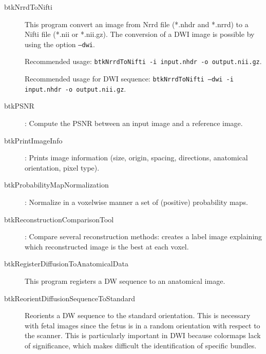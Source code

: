 \begin{description}
\item[btkNrrdToNifti] This program convert an image from Nrrd file (*.nhdr and *.nrrd) to a Nifti file (*.nii or *.nii.gz). The conversion of a DWI image is possible by using the option \texttt{--dwi}.

Recommended usage: \texttt{btkNrrdToNifti -i input.nhdr -o output.nii.gz}. 

Recommended usage  for DWI sequence: \texttt{btkNrrdToNifti --dwi -i input.nhdr -o output.nii.gz}.
\item[btkPSNR]: Compute the PSNR between an input image and a reference image.
\item[btkPrintImageInfo]: Prints image information (size, origin, spacing, directions, anatomical orientation, pixel type).
\item[btkProbabilityMapNormalization]: Normalize in a voxelwise manner a set of (positive) probability maps. 
\item[btkReconstructionComparisonTool]: Compare several reconstruction methods: creates a label image explaining which reconstructed image is the best at each voxel.
\item[btkRegisterDiffusionToAnatomicalData] This program registers a DW
sequence to an anatomical image. 

\item[btkReorientDiffusionSequenceToStandard] Reorients a DW sequence
to the standard orientation. This is necessary with fetal images since the fetus
is in a random orientation with respect to the scanner. This is particularly
important in DWI because colormaps lack of significance, which makes difficult
the identification of specific bundles.


\end{description}
